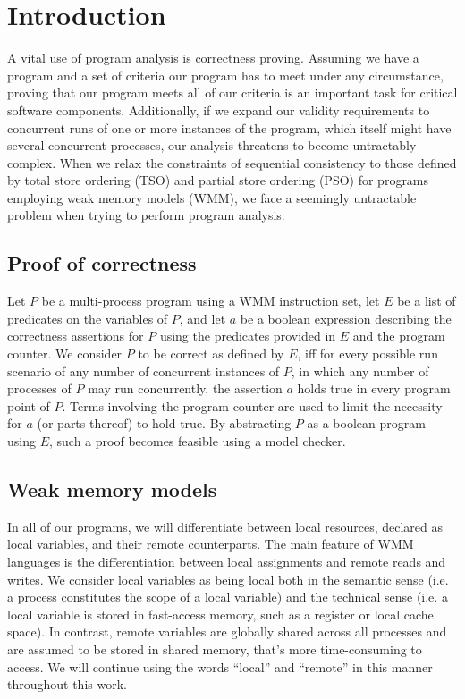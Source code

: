 \section{Introduction}

A vital use of program analysis is correctness proving. Assuming we have a program and a set of criteria our program has to meet under any circumstance, proving that our program meets all of our criteria is an important task for critical software components. Additionally, if we expand our validity requirements to concurrent runs of one or more instances of the program, which itself might have several concurrent processes, our analysis threatens to become untractably complex. When we relax the constraints of sequential consistency to those defined by total store ordering (TSO) and partial store ordering (PSO) for programs employing weak memory models (WMM), we face a seemingly untractable problem when trying to perform program analysis.

\subsection{Proof of correctness}

Let $P$ be a multi-process program using a WMM instruction set, let $E$ be a list of predicates on the variables of $P$, and let $a$ be a boolean expression describing the correctness assertions for $P$ using the predicates provided in $E$ and the program counter. We consider $P$ to be correct as defined by $E$, iff for every possible run scenario of any number of concurrent instances of $P$, in which any number of processes of $P$ may run concurrently, the assertion $a$ holds true in every program point of $P$. Terms involving the program counter are used to limit the necessity for $a$ (or parts thereof) to hold true. By abstracting $P$ as a boolean program using $E$, such a proof becomes feasible using a model checker.

\subsection{Weak memory models}

In all of our programs, we will differentiate between local resources, declared as local variables, and their remote counterparts. The main feature of WMM languages is the differentiation between local assignments and remote reads and writes. We consider local variables as being local both in the semantic sense (i.e. a process constitutes the scope of a local variable) and the technical sense (i.e. a local variable is stored in fast-access memory, such as a register or local cache space). In contrast, remote variables are globally shared across all processes and are assumed to be stored in shared memory, that's more time-consuming to access. We will continue using the words ``local'' and ``remote'' in this manner throughout this work.\\

